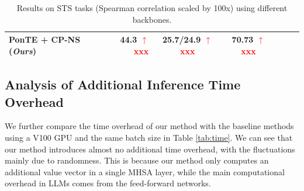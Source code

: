 \documentclass[11pt]{article}
\newcommand{\up}[1]{\textcolor{red}{{$\uparrow$#1}}}
\newcommand{\down}[1]{\textcolor{red}{{$\downarrow$#1}}}
\begin{document}
\begin{table}[t]
{\begin{tabular}{lrccccc}
PonTE + CP-NS (\textbf{\textit{Ours}}) & \cellcolor{tabcolor3} 44.3 \up{xxx} & \cellcolor{tabcolor3} 25.7/24.9 \up{xxx}& \cellcolor{tabcolor3} 70.73 \up{xxx}  \\
\bottomrule
\end{tabular}
}
\caption{Results on STS tasks (Spearman correlation scaled by 100x) using different backbones.}
\label{tab:backbone}
\end{table}
\fi

\subsection{Analysis of Additional Inference Time Overhead}
We further compare the time overhead of our method with the baseline methods using a V100 GPU and the same batch size in Table \ref{tab:time}.
We can see that our method introduces almost no additional time overhead, with the fluctuations mainly due to randomness.
This is because our method only computes an additional value vector in a single MHSA layer, while the main computational overhead in LLMs comes from the feed-forward networks.
\end{document}
